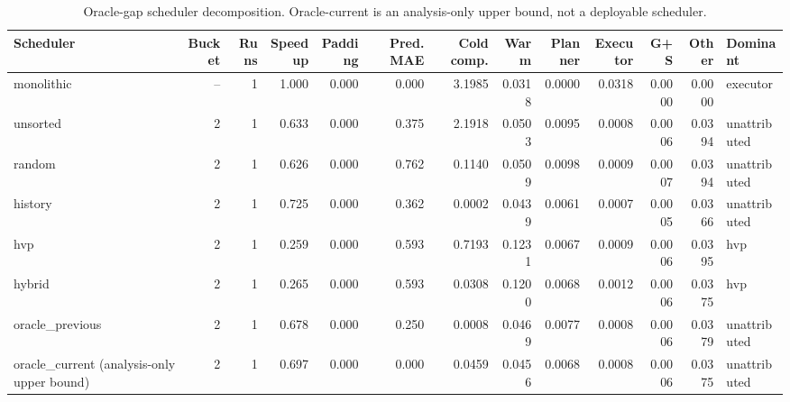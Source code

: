 \begin{table}[t]
\centering
\scriptsize
\caption{Oracle-gap scheduler decomposition. Oracle-current is an analysis-only upper bound, not a deployable scheduler.}
\label{tab:oracle-gap}
\begin{tabular}{lrrrrrrrrrrrl}
\hline
Scheduler & Bucket & Runs & Speedup & Padding & Pred. MAE & Cold comp. & Warm & Planner & Executor & G+S & Other & Dominant \\
\hline
monolithic & -- & 1 & 1.000 & 0.000 & 0.000 & 3.1985 & 0.0318 & 0.0000 & 0.0318 & 0.0000 & 0.0000 & executor \\
unsorted & 2 & 1 & 0.633 & 0.000 & 0.375 & 2.1918 & 0.0503 & 0.0095 & 0.0008 & 0.0006 & 0.0394 & unattributed \\
random & 2 & 1 & 0.626 & 0.000 & 0.762 & 0.1140 & 0.0509 & 0.0098 & 0.0009 & 0.0007 & 0.0394 & unattributed \\
history & 2 & 1 & 0.725 & 0.000 & 0.362 & 0.0002 & 0.0439 & 0.0061 & 0.0007 & 0.0005 & 0.0366 & unattributed \\
hvp & 2 & 1 & 0.259 & 0.000 & 0.593 & 0.7193 & 0.1231 & 0.0067 & 0.0009 & 0.0006 & 0.0395 & hvp \\
hybrid & 2 & 1 & 0.265 & 0.000 & 0.593 & 0.0308 & 0.1200 & 0.0068 & 0.0012 & 0.0006 & 0.0375 & hvp \\
oracle\_previous & 2 & 1 & 0.678 & 0.000 & 0.250 & 0.0008 & 0.0469 & 0.0077 & 0.0008 & 0.0006 & 0.0379 & unattributed \\
oracle\_current (analysis-only upper bound) & 2 & 1 & 0.697 & 0.000 & 0.000 & 0.0459 & 0.0456 & 0.0068 & 0.0008 & 0.0006 & 0.0375 & unattributed \\
\hline
\end{tabular}
\end{table}
